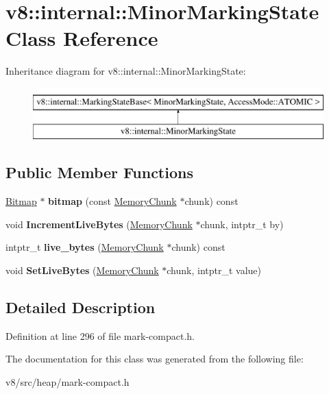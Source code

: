 \hypertarget{classv8_1_1internal_1_1MinorMarkingState}{}\section{v8\+:\+:internal\+:\+:Minor\+Marking\+State Class Reference}
\label{classv8_1_1internal_1_1MinorMarkingState}
Inheritance diagram for v8\+:\+:internal\+:\+:Minor\+Marking\+State\+:\begin{figure}[H]
\begin{center}
\leavevmode
\includegraphics[height=2.000000cm]{classv8_1_1internal_1_1MinorMarkingState}
\end{center}
\end{figure}
\subsection*{Public Member Functions}
\begin{DoxyCompactItemize}
\item 
\mbox{\label{classv8_1_1internal_1_1MinorMarkingState_a660a2f6d084954f59574e371c3beab36}} 
\mbox{\hyperlink{classv8_1_1internal_1_1Bitmap}{Bitmap}} $\ast$ {\bfseries bitmap} (const \mbox{\hyperlink{classv8_1_1internal_1_1MemoryChunk}{Memory\+Chunk}} $\ast$chunk) const
\item 
\mbox{\label{classv8_1_1internal_1_1MinorMarkingState_a2cc857f3eaf4d50560364d46746ca70b}} 
void {\bfseries Increment\+Live\+Bytes} (\mbox{\hyperlink{classv8_1_1internal_1_1MemoryChunk}{Memory\+Chunk}} $\ast$chunk, intptr\+\_\+t by)
\item 
\mbox{\label{classv8_1_1internal_1_1MinorMarkingState_a9d2e2ad9a82033bb62e23ad7783e98b0}} 
intptr\+\_\+t {\bfseries live\+\_\+bytes} (\mbox{\hyperlink{classv8_1_1internal_1_1MemoryChunk}{Memory\+Chunk}} $\ast$chunk) const
\item 
\mbox{\label{classv8_1_1internal_1_1MinorMarkingState_a443ea7687f7eabdfc26945e3962b9444}} 
void {\bfseries Set\+Live\+Bytes} (\mbox{\hyperlink{classv8_1_1internal_1_1MemoryChunk}{Memory\+Chunk}} $\ast$chunk, intptr\+\_\+t value)
\end{DoxyCompactItemize}


\subsection{Detailed Description}


Definition at line 296 of file mark-\/compact.\+h.



The documentation for this class was generated from the following file\+:\begin{DoxyCompactItemize}
\item 
v8/src/heap/mark-\/compact.\+h\end{DoxyCompactItemize}
